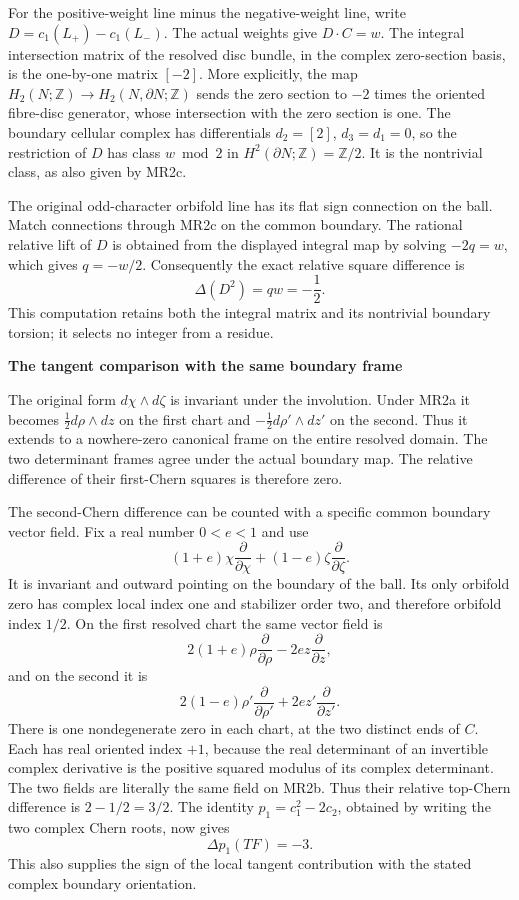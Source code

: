 For the positive-weight line minus the negative-weight line, write
\(D=c_1(L_+)-c_1(L_-)\). The actual weights give
\(D\cdot C=w\). The integral intersection matrix of the resolved
disc bundle, in the complex zero-section basis, is the one-by-one
matrix \([-2]\). More explicitly, the map
\(H_2(N;\mathbb Z)\to H_2(N,\partial N;\mathbb Z)\)
sends the zero section to \(-2\) times the oriented fibre-disc
generator, whose intersection with the zero section is one. The
boundary cellular complex has differentials \(d_2=[2]\),
\(d_3=d_1=0\), so the restriction of \(D\) has class
\(w\bmod2\) in \(H^2(\partial N;\mathbb Z)=\mathbb Z/2\).
It is the nontrivial class, as also given by MR2c.

The original odd-character orbifold line has its flat sign connection
on the ball. Match connections through MR2c on the common boundary.
The rational relative lift of \(D\) is obtained from the displayed
integral map by solving \(-2q=w\), which gives \(q=-w/2\).
Consequently the exact relative square difference is
\[
 \Delta(D^2)=q w=-\frac12.
\tag{MR2d}
\]
This computation retains both the integral matrix and its nontrivial
boundary torsion; it selects no integer from a residue.

\par

\medskip\noindent\textbf{The tangent comparison with the same boundary frame}

\par\nobreak

The original form \(d\chi\wedge d\zeta\) is invariant under the
involution. Under MR2a it becomes
\(\tfrac12 d\rho\wedge dz\) on the first chart and
\(-\tfrac12 d\rho'\wedge dz'\) on the second. Thus it extends
to a nowhere-zero canonical frame on the entire resolved domain.
The two determinant frames agree under the actual boundary map. The
relative difference of their first-Chern squares is therefore zero.

The second-Chern difference can be counted with a specific common
boundary vector field. Fix a real number \(0<e<1\) and use
\[
 (1+e)\chi\frac{\partial}{\partial\chi}
 +(1-e)\zeta\frac{\partial}{\partial\zeta}.
\tag{MR2e}
\]
It is invariant and outward pointing on the boundary of the ball.
Its only orbifold zero has complex local index one and stabilizer
order two, and therefore orbifold index \(1/2\). On the first
resolved chart the same vector field is
\[
 2(1+e)\rho\frac{\partial}{\partial\rho}
       -2e z\frac{\partial}{\partial z},
\]
and on the second it is
\[
 2(1-e)\rho'\frac{\partial}{\partial\rho'}
       +2e z'\frac{\partial}{\partial z'}.
\]
There is one nondegenerate zero in each chart, at the two distinct
ends of \(C\). Each has real oriented index \(+1\), because
the real determinant of an invertible complex derivative is the
positive squared modulus of its complex determinant. The two fields
are literally the same field on MR2b. Thus their relative top-Chern
difference is \(2-1/2=3/2\). The identity
\(p_1=c_1^2-2c_2\), obtained by writing the two complex Chern roots,
now gives
\[
 \Delta p_1(TF)=-3.
\tag{MR2f}
\]
This also supplies the sign of the local tangent contribution with
the stated complex boundary orientation.

